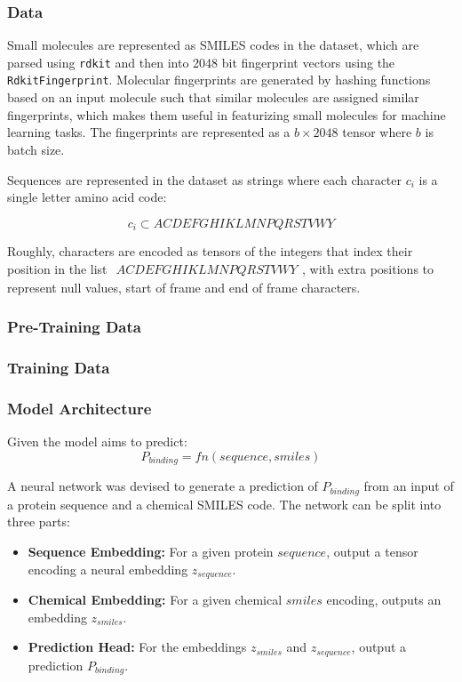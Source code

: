\documentclass{article}
\begin{document}
\subsubsection{Data}

Small molecules are represented as SMILES codes in the dataset, which are parsed using \texttt{rdkit} and then into 2048 bit fingerprint vectors using the \texttt{RdkitFingerprint}.
Molecular fingerprints are generated by hashing functions based on an input molecule such that similar molecules are assigned similar fingerprints, which makes them useful in featurizing small molecules for machine learning tasks.
The fingerprints are represented as a $b \times 2048$ tensor where $b$ is batch size.

Sequences are represented in the dataset as strings where each character $c_i$ is a single letter amino acid code:

$$c_i \subset{ACDEFGHIKLMNPQRSTVWY}$$

Roughly, characters are encoded as tensors of the integers that index their position in the list $\begin{matrix} ACDEFGHIKLMNPQRSTVWY\end{matrix}$, with extra positions to represent null values, start of frame and end of frame characters.

	\subsubsection{Pre-Training Data}

\subsubsection{Training Data}

\subsubsection{Model Architecture}

Given the model aims to predict:
$$
P_{binding} = fn(sequence, smiles)
$$

A neural network was devised to generate a prediction of $P_{binding}$ from an input of a protein sequence and a chemical SMILES code.
The network can be split into three parts:

\begin{itemize}
	\item \textbf{Sequence Embedding:} For a given protein $sequence$, output a tensor encoding a neural embedding $z_{sequence}$.
	\item \textbf{Chemical Embedding:} For a given chemical $smiles$ encoding, outputs an embedding $z_{smiles}$.
	\item \textbf{Prediction Head:} For the embeddings $z_{smiles}$ and $z_{sequence}$, output a prediction $P_{binding}$.
\end{itemize}
\end{document}
